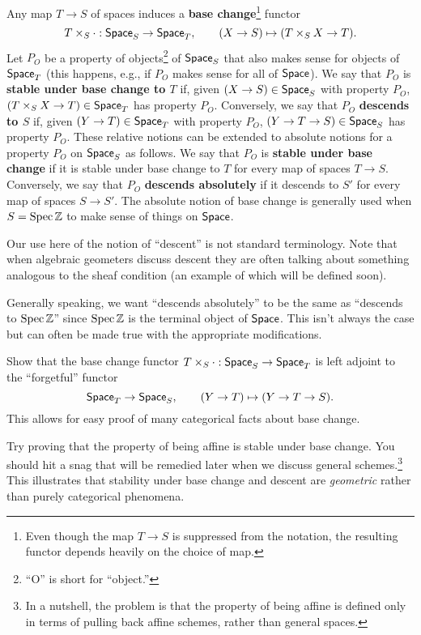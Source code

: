 \documentclass[11pt]{article}
\begin{document}
Any map $T\to S$ of spaces induces a \textbf{base change}\footnote{Even though the map $T\to S$ is suppressed from the notation, the resulting functor depends heavily on the choice of map.} functor 
$$T\times_S\cdot: \operatorname{\mathsf{Space}}_S\to\operatorname{\mathsf{Space}}_T,\qquad (X\to S)\mapsto(T\times_SX\to T).$$ 
Let $P_O$ be a property of objects\footnote{``O'' is short for ``object.''} of $\operatorname{\mathsf{Space}}_S$ that also makes sense for objects of $\operatorname{\mathsf{Space}}_T$ (this happens, e.g., if $P_O$ makes sense for all of $\operatorname{\mathsf{Space}}$). We say that $P_O$ is \textbf{stable under base change to $T$} if, given $(X\to S)\in\operatorname{\mathsf{Space}}_S$ with property $P_O$, $(T\times_SX\to T)\in\operatorname{\mathsf{Space}}_T$ has property $P_O$. Conversely, we say that $P_O$ \textbf{descends to $S$} if, given $(Y\to T)\in\operatorname{\mathsf{Space}}_T$ with property $P_O$, $(Y\to T\to S)\in\operatorname{\mathsf{Space}}_S$ has property $P_O$. These relative notions can be extended to absolute notions for a property $P_O$ on $\operatorname{\mathsf{Space}}_S$ as follows. We say that $P_O$ is \textbf{stable under base change} if it is stable under base change to $T$ for every map of spaces $T\to S$. Conversely, we say that $P_O$ \textbf{descends absolutely} if it descends to $S'$ for every map of spaces $S\to S'$. The absolute notion of base change is generally used when $S=\operatorname{Spec}\mathbb{Z}$ to make sense of things on $\operatorname{\mathsf{Space}}$.

\begin{remark}
Our use here of the notion of ``descent'' is not standard terminology. Note that when algebraic geometers discuss descent they are often talking about something analogous to the sheaf condition (an example of which will be defined soon).
\end{remark}

\begin{remark}
Generally speaking, we want ``descends absolutely'' to be the same as ``descends to $\operatorname{Spec}\mathbb{Z}$'' since $\operatorname{Spec}\mathbb{Z}$ is the terminal object of $\operatorname{\mathsf{Space}}$. This isn't always the case but can often be made true with the appropriate modifications.
\end{remark}

\begin{exercise}
Show that the base change functor $T\times_S\cdot: \operatorname{\mathsf{Space}}_S\to\operatorname{\mathsf{Space}}_T$ is left adjoint to the ``forgetful'' functor 
$$\operatorname{\mathsf{Space}}_T\to\operatorname{\mathsf{Space}}_S,\qquad(Y\to T)\mapsto(Y\to T\to S).$$
This allows for easy proof of many categorical facts about base change.
\end{exercise}

\begin{exercise}
Try proving that the property of being affine is stable under base change. You should hit a snag that will be remedied later when we discuss general schemes.\footnote{In a nutshell, the problem is that the property of being affine is defined only in terms of pulling back affine schemes, rather than general spaces.} This illustrates that stability under base change and descent are \emph{geometric} rather than purely categorical phenomena.
\end{exercise}
\end{document}
